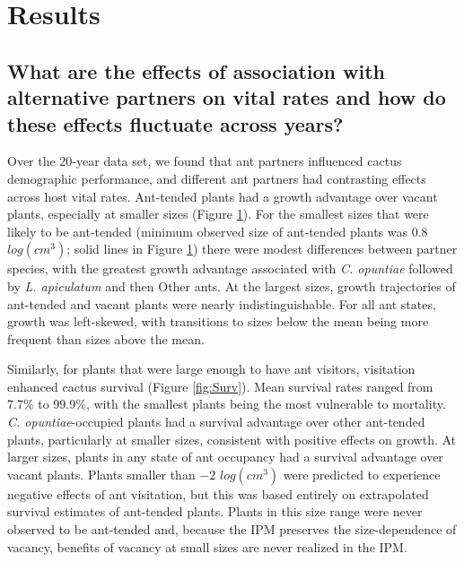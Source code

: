 \documentclass[11pt]{article}
\begin{document}
\section*{Results}
\subsection*{What are the effects of association with alternative partners on vital rates and how do these effects fluctuate across years?}
Over the 20-year data set, we found that ant partners influenced cactus demographic performance, and different ant partners had contrasting effects across host vital rates. 
Ant-tended plants had a growth advantage over vacant plants, especially at smaller sizes (Figure \ref{fig:Grow}).
For the smallest sizes that were likely to be ant-tended (minimum observed size of ant-tended plants was $0.8$ $log(cm^3)$; solid lines in Figure \ref{fig:Grow}) there were modest differences between partner species, with the greatest growth advantage associated with \textit{C. opuntiae} followed by \textit{L. apiculatum} and then Other ants.
At the largest sizes, growth trajectories of ant-tended and vacant plants were nearly indistinguishable. 
For all ant states, growth was left-skewed, with transitions to sizes below the mean being more frequent than sizes above the mean. 

Similarly, for plants that were large enough to have ant visitors, visitation enhanced cactus survival (Figure \ref{fig:Surv}). 
Mean survival rates ranged from 7.7\% to 99.9\%, with the smallest plants being the most vulnerable to mortality. 
\textit{C. opuntiae}-occupied plants had a survival advantage over other ant-tended plants, particularly at smaller sizes, consistent with positive effects on growth. 
At larger sizes, plants in any state of ant occupancy had a survival advantage over vacant plants. 
Plants smaller than $-2$ $log(cm^3)$ were predicted to experience negative effects of ant visitation, but this was based entirely on extrapolated survival estimates of ant-tended plants. 
Plants in this size range were never observed to be ant-tended and, because the IPM preserves the size-dependence of vacancy, benefits of vacancy at small sizes are never realized in the IPM. 


\begin{figure}[H]
	\caption{}
	
	\label{fig:Grow}
\end{figure} 
\end{document}
